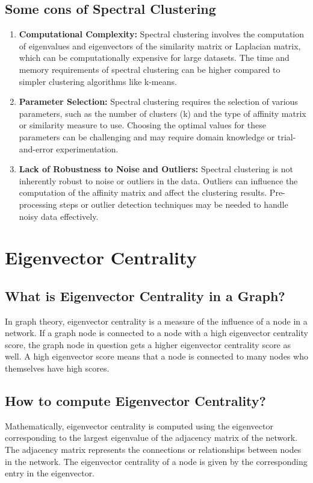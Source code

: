 \documentclass{article}
\begin{document}
    \subsection{Some cons of Spectral Clustering}
        \begin{enumerate}
            \item \textbf{Computational Complexity: }Spectral clustering involves the computation of eigenvalues and eigenvectors of the similarity matrix or Laplacian matrix, which can be computationally expensive for large datasets. The time and memory requirements of spectral clustering can be higher compared to simpler clustering algorithms like k-means.
            \item \textbf{Parameter Selection: }Spectral clustering requires the selection of various parameters, such as the number of clusters (k) and the type of affinity matrix or similarity measure to use. Choosing the optimal values for these parameters can be challenging and may require domain knowledge or trial-and-error experimentation.
            \item \textbf{Lack of Robustness to Noise and Outliers: }Spectral clustering is not inherently robust to noise or outliers in the data. Outliers can influence the computation of the affinity matrix and affect the clustering results. Pre-processing steps or outlier detection techniques may be needed to handle noisy data effectively.
        \end{enumerate}

\section{Eigenvector Centrality}
    \subsection{What is Eigenvector Centrality in a Graph?}
    In graph theory, eigenvector centrality is a measure of the influence of a node in a network. If a graph node is connected to a node with a high eigenvector centrality score, the graph node in question gets a higher eigenvector centrality score as well. A high eigenvector score means that a node is connected to many nodes who themselves have high scores.

    \subsection{How to compute Eigenvector Centrality?}
    Mathematically, eigenvector centrality is computed using the eigenvector corresponding to the largest eigenvalue of the adjacency matrix of the network. The adjacency matrix represents the connections or relationships between nodes in the network. The eigenvector centrality of a node is given by the corresponding entry in the eigenvector.
\end{document}
